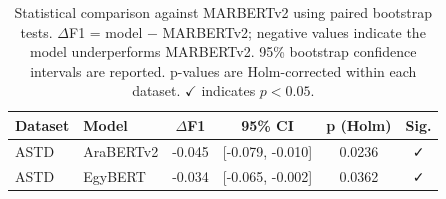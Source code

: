 \begin{table}[t]
\centering
\caption{Statistical comparison against MARBERTv2 using paired bootstrap tests. $\Delta$F1 = model $-$ MARBERTv2; negative values indicate the model underperforms MARBERTv2. 95\% bootstrap confidence intervals are reported. p-values are Holm-corrected within each dataset. $\checkmark$ indicates $p < 0.05$.}
\label{tab:significance}
\begin{tabular}{l l c c c c}
\toprule
Dataset & Model & $\Delta$F1 & 95\% CI & p (Holm) & Sig. \\
\midrule
ASTD & AraBERTv2 & -0.045 & [-0.079, -0.010] & 0.0236 & ✓ \\
ASTD & EgyBERT & -0.034 & [-0.065, -0.002] & 0.0362 & ✓ \\
\bottomrule
\end{tabular}
\end{table}
